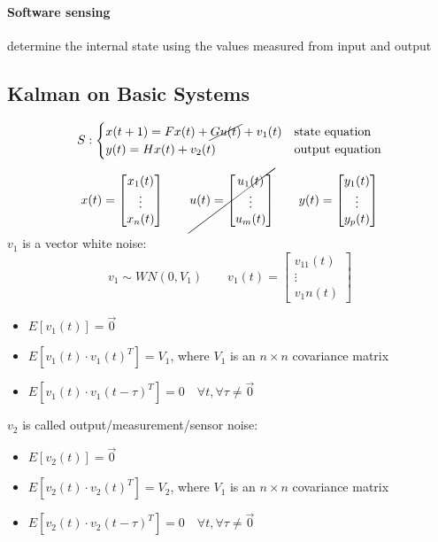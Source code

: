 \documentclass{report}
\begin{document}
\paragraph{Software sensing} determine the internal state using the values measured from input and output

\subsection{Kalman on Basic Systems}
\[
S:
\begin{cases}
x(t+1)=Fx(t)+\cancel{Gu(t)}+v_1(t)&\text{state equation}\\
y(t)=Hx(t)+v_2(t)&\text{output equation}
\end{cases}
\]
\[
x(t)=\begin{bmatrix}
x_1(t)\\\vdots\\x_n(t)
\end{bmatrix}
\qquad
\cancel{
u(t)=\begin{bmatrix}
u_1(t)\\\vdots\\u_m(t)
\end{bmatrix}
}
\qquad
y(t)=\begin{bmatrix}
y_1(t)\\\vdots\\y_p(t)
\end{bmatrix}
\]
$v_1$ is a vector white noise:
\[
v_1 \sim WN(0,V_1)
\qquad
v_1(t)=\begin{bmatrix}
v_11(t)\\\vdots\\v_1n(t)
\end{bmatrix}
\]
\begin{itemize}
\item $E \left[v_1(t)\right]=\vec{0}$
\item $E\left[v_1(t)\cdot v_1(t)^T\right]=V_1$, where $V_1$ is an $n\times n$ covariance matrix
\item $E\left[v_1(t)\cdot v_1(t-\tau)^T\right]=0 \quad \forall t, \forall\tau\neq \vec{0}$
\end{itemize}
$v_2$ is called output/measurement/sensor noise: 
\begin{itemize}
\item $E \left[v_2(t)\right]=\vec{0}$
\item $E\left[v_2(t)\cdot v_2(t)^T\right]=V_2$, where $V_1$ is an $n\times n$ covariance matrix
\item $E\left[v_2(t)\cdot v_2(t-\tau)^T\right]=0 \quad \forall t, \forall\tau\neq \vec{0}$
\end{itemize}
\end{document}
